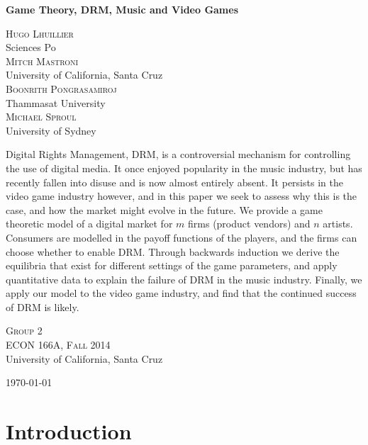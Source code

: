 \documentclass[a4paper,12pt]{article}
\numberwithin{equation}{section}
\renewenvironment{abstract}
 {\small
  \begin{center}
  \bfseries \abstractname\vspace{-.5em}\vspace{0pt}
  \end{center}
  \list{}{%
    \setlength{\leftmargin}{30mm}%
    \setlength{\rightmargin}{\leftmargin}%
  }%
  \item\relax}
 {\endlist}
\begin{document}
\begin{titlepage}
\begin{center}

\vspace*{3cm}
\Large
\textbf{Game Theory, DRM, Music and Video Games}

\vspace*{0.5cm}
\large
\textsc{Hugo Lhuillier}\\
Sciences Po\\[1.2em]
\textsc{Mitch Mastroni}\\
University of California, Santa Cruz\\[1.2em]
\textsc{Boonrith Pongrasamiroj}\\
Thammasat University\\[1.2em]
\textsc{Michael Sproul}\\
University of Sydney

\vspace*{1cm}
\begin{abstract}
Digital Rights Management, DRM, is a controversial mechanism for controlling the use of digital media. It once enjoyed popularity in the music industry, but has recently fallen into disuse and is now almost entirely absent. It persists in the video game industry however, and in this paper we seek to assess why this is the case, and how the market might evolve in the future. We provide a game theoretic model of a digital market for $m$ firms (product vendors) and $n$ artists. Consumers are modelled in the payoff functions of the players, and the firms can choose whether to enable DRM. Through backwards induction we derive the equilibria that exist for different settings of the game parameters, and apply quantitative data to explain the failure of DRM in the music industry. Finally, we apply our model to the video game industry, and find that the continued success of DRM is likely.
\end{abstract}

\vfill

\normalsize
\textsc{Group 2}\\[1.2em]
\textsc{ECON 166A, Fall 2014}\\
University of California, Santa Cruz

\today

\end{center}
\end{titlepage}
\pagebreak

\section{Introduction}
\end{document}

